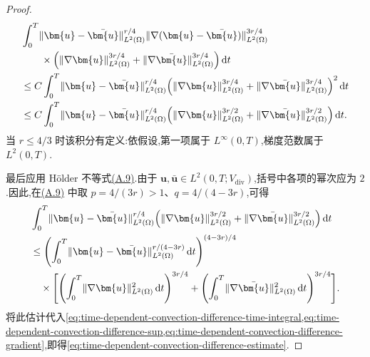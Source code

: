 \begin{lemma}[非线性对流项差的估计]
\begin{proof}
\begin{equation}\label{eq:time-dependent-convection-difference-gradient}
\begin{aligned}
  &\int_0^T
       \lVert\bm{u}-\bar{\bm{u}}\rVert_{L^2(\Omega)}^{r/4}
       \lVert\nabla(\bm{u}-\bar{\bm{u}})\rVert_{L^2(\Omega)}^{3r/4}\\
  &\qquad\times\Bigl(
       \lVert\nabla\bm{u}\rVert_{L^2(\Omega)}^{3r/4}
       +\lVert\nabla\bar{\bm{u}}\rVert_{L^2(\Omega)}^{3r/4}
       \Bigr)\,\mathrm{d}t\\
  &\leq C\int_0^T
       \lVert\bm{u}-\bar{\bm{u}}\rVert_{L^2(\Omega)}^{r/4}
       \Bigl(
       \lVert\nabla\bm{u}\rVert_{L^2(\Omega)}^{3r/4}
       +\lVert\nabla\bar{\bm{u}}\rVert_{L^2(\Omega)}^{3r/4}
       \Bigr)^2\,\mathrm{d}t\\
  &\leq C\int_0^T
       \lVert\bm{u}-\bar{\bm{u}}\rVert_{L^2(\Omega)}^{r/4}
       \Bigl(
       \lVert\nabla\bm{u}\rVert_{L^2(\Omega)}^{3r/2}
       +\lVert\nabla\bar{\bm{u}}\rVert_{L^2(\Omega)}^{3r/2}
       \Bigr)\,\mathrm{d}t.
\end{aligned}
\end{equation}
当 $r\leq4/3$ 时该积分有定义:依假设,第一项属于 $L^\infty(0,T)$,梯度范数属于 $L^2(0,T)$.

最后应用 Hölder 不等式\hyperref[eq:appendix-a-9]{(A.9)}.由于 $\bm{u},\bar{\bm{u}}\in L^2(0,T;V_{\mathrm{div}})$,括号中各项的幂次应为 $2$.因此,在\hyperref[eq:appendix-a-9]{(A.9)} 中取 $p=4/(3r)>1$、$q=4/(4-3r)$,可得
\[
\begin{aligned}
  &\int_0^T
       \lVert\bm{u}-\bar{\bm{u}}\rVert_{L^2(\Omega)}^{r/4}
       \Bigl(
       \lVert\nabla\bm{u}\rVert_{L^2(\Omega)}^{3r/2}
       +\lVert\nabla\bar{\bm{u}}\rVert_{L^2(\Omega)}^{3r/2}
       \Bigr)\,\mathrm{d}t\\
  &\leq
       \Biggl(\int_0^T
       \lVert\bm{u}-\bar{\bm{u}}\rVert_{L^2(\Omega)}^{r/(4-3r)}
       \,\mathrm{d}t\Biggr)^{(4-3r)/4}\\
  &\quad\times\Biggl[
       \Biggl(\int_0^T\lVert\nabla\bm{u}\rVert_{L^2(\Omega)}^2
          \,\mathrm{d}t\Biggr)^{3r/4}
       +\Biggl(\int_0^T\lVert\nabla\bar{\bm{u}}\rVert_{L^2(\Omega)}^2
          \,\mathrm{d}t\Biggr)^{3r/4}
       \Biggr].
\end{aligned}
\]
将此估计代入\cref{eq:time-dependent-convection-difference-time-integral,eq:time-dependent-convection-difference-sup,eq:time-dependent-convection-difference-gradient},即得\cref{eq:time-dependent-convection-difference-estimate}.
\end{proof}
\end{lemma}

